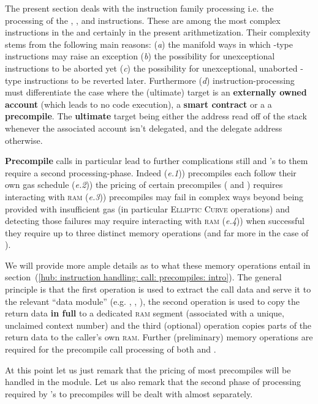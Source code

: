 The present section deals with the  instruction family processing i.e. the processing of the
, ,  and  instructions.
These are among the most complex instructions in the \evm{} and certainly in the present arithmetization.
Their complexity stems from the following main reasons:
(\emph{a}) the manifold ways in which -type instructions may raise an exception
(\emph{b}) the possibility for unexceptional instructions to be aborted yet
(\emph{c}) the possibility for unexceptional, unaborted -type instructions to be reverted later.
Furthermore
(\emph{d}) instruction-processing must differentiate the case where the (ultimate) target is
an \textbf{externally owned account} (which leads to no code execution),
a \textbf{smart contract} or a
a \textbf{precompile}.
The \textbf{ultimate} target being either
the address read off of the stack whenever the associated account isn't delegated,
and the delegate address otherwise.

\textbf{Precompile} calls in particular lead to further complications still and 's to them require a second processing-phase.
Indeed
(\emph{e.1})) precompiles each follow their own gas schedule
(\emph{e.2})) the pricing of certain precompiles (\instModexp{} and \instBlake{}) requires interacting with \textsc{ram}
(\emph{e.3})) precompiles may fail in complex ways beyond being provided with insufficient gas (in particular \textsc{Elliptic Curve} operations) and detecting those failures may require interacting with \textsc{ram}
(\emph{e.4})) when successful they require up to three distinct memory operations (and far more in the case of \instModexp{}).

We will provide more ample details as to what these memory operations entail in section~(\ref{hub: instruction handling: call: precompiles: intro}).
The general principle is that
the first operation is used to extract the call data and serve it to the relevant ``data module'' (e.g. \shakiraMod{}, \ecDataMod{}, \blkMdxMod{}),
the second operation is used to copy the return data \textbf{in full} to a dedicated \textsc{ram} segment (associated with a unique, unclaimed context number) and
the third (optional) operation copies parts of the return data to the caller's own \textsc{ram}.
Further (preliminary) memory operations are required for the precompile call processing of both \instModexp{} and \instBlake{}.

At this point let us just remark that the pricing of most precompiles will be handled in the \oobMod{} module. Let us also remark that the second phase of processing required by 's to precompiles will be dealt with almost separately.
